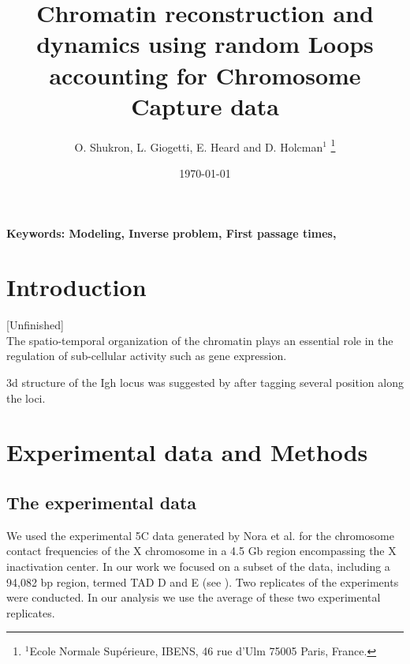 \documentclass[12pt]{article}
\begin{document}
\title{Chromatin reconstruction and dynamics using random Loops accounting for Chromosome Capture data}
\author{O. Shukron,  L. Giogetti, E. Heard and D. Holcman$^{1}$ \footnote{ $^1$Ecole Normale Sup\'erieure, IBENS, 46 rue d'Ulm 75005 Paris, France.}}
\date{\today}
\maketitle
\begin{abstract}\label{abstract}
\end{abstract}
{\bf \noindent Keywords: Modeling, Inverse problem, First passage times,}\\

\section{Introduction}\label{section_introduction}
[Unfinished]\\
The spatio-temporal organization of the chromatin plays an essential role in the regulation of sub-cellular activity such as gene expression\cite{cremer2001chromosome}.




3d structure of the Igh locus was suggested by \cite{jhunjhunwala20083d} after tagging several position along the loci.


\section{Experimental data and Methods}\label{section_experimentalDataAndMethods}

\subsection{The experimental data}\label{subsection_theExperimentalData}
We used the experimental 5C data generated by Nora et al.\cite{Nora2012} for the chromosome contact frequencies of the X chromosome in a 4.5 Gb region encompassing the X inactivation center. In our work we focused on a subset of the data, including a 94,082 bp region, termed TAD D and E (see \cite{Nora2012}).
Two replicates of the experiments were conducted. In our analysis we use the average of these two experimental  replicates.
\end{document}
